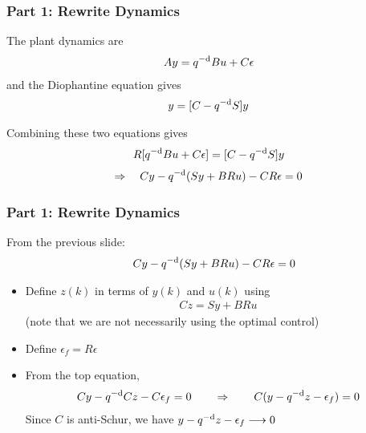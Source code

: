 \begin{frame}
    \frametitle{Part 1: Rewrite Dynamics}

    The plant dynamics are
    \begin{align*}
        Ay = q^{-\textrm{d}} Bu + C \epsilon
    \end{align*}
    and the Diophantine equation gives
    \begin{align*}
        [RA]y = [C - \qmd S] y
    \end{align*}
    \paused

    Combining these two equations gives
    \begin{align*}
        R [q^{-\textrm{d}} Bu + C \epsilon] = [C - q^{-\textrm{d}} S] y
    \end{align*}
    \paused
    \begin{align*}
        \Rightarrow \quad Cy - q^{-\textrm{d}}(Sy + BRu) - CR\epsilon = 0
    \end{align*}

\end{frame}

\begin{frame}
    \frametitle{Part 1: Rewrite Dynamics}

    From the previous slide:
    \begin{align*}
        \quad Cy - q^{-\textrm{d}}(Sy + BRu) - CR\epsilon = 0
    \end{align*}

    \begin{itemize}
        \item
        Define $z(k)$ in terms of $y(k)$ and $u(k)$ using
        \begin{align*}
            Cz = Sy + BRu
        \end{align*}
        (note that we are not necessarily using the optimal control)
        \pause

        \item
        Define $\epsilon_f = R\epsilon$
        \pause

        \item
        From the top equation,
        \begin{gather*}
            Cy - q^{-\textrm{d}} Cz - C\epsilon_f = 0 \qquad \Rightarrow \qquad C (y - q^{-\textrm{d}} z - \epsilon_f) = 0
        \end{gather*}
        \pause
        Since $C$ is anti-Schur, we have $y - q^{-\textrm{d}} z - \epsilon_f \longrightarrow 0$
        \pause

    \end{itemize}
\end{frame}

